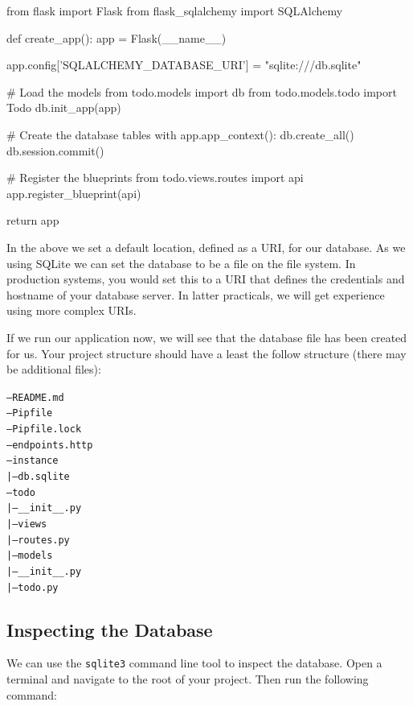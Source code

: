 \documentclass{csse4400}
\begin{document}
\begin{code}[language=python,numbers=none]{}
  from flask import Flask
  from flask_sqlalchemy import SQLAlchemy

  def create_app():
      app = Flask(__name__)

      app.config['SQLALCHEMY_DATABASE_URI'] = "sqlite:///db.sqlite"

      # Load the models
      from todo.models import db
      from todo.models.todo import Todo
      db.init_app(app)

      # Create the database tables
      with app.app_context():
        db.create_all()
        db.session.commit()

      # Register the blueprints
      from todo.views.routes import api
      app.register_blueprint(api)

      return app

\end{code}

In the above we set a default location, defined as a URI, for our database.
As we using SQLite we can set the database to be a file on the file system.
In production systems, you would set this to a URI that defines the credentials and hostname of your database server.
In latter practicals, we will get experience using more complex URIs.

If we run our application now, we will see that the database file has been created for us.
Your project structure should have a least the follow structure (there may be additional files):

\begin{alltt}
-- README.md
-- Pipfile
-- Pipfile.lock
-- endpoints.http
-- instance
  | -- db.sqlite
-- todo
  | -- __init__.py
  | -- views
      | -- routes.py
  | -- models
      | -- __init__.py
      | -- todo.py
\end{alltt}

\subsection{Inspecting the Database}

We can use the \texttt{sqlite3} command line tool to inspect the database.
Open a terminal and navigate to the root of your project.
Then run the following command:


\end{document}
